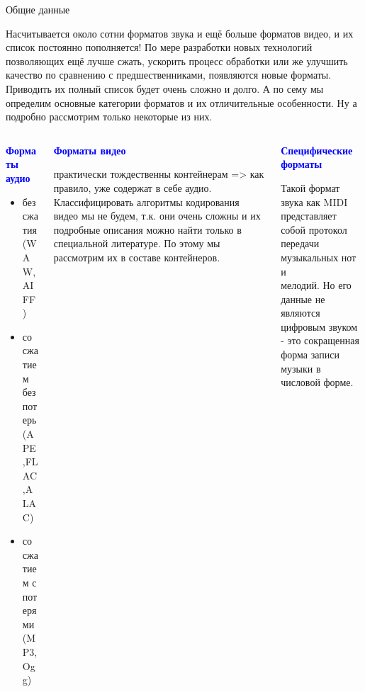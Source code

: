 \documentclass[aspectratio=169]{beamer}
\newcommand{\blu}{\textcolor{blue}}
\begin{document}
\begin{frame}[shrink=15]{Общие данные}

    Насчитывается около сотни форматов звука и ещё больше форматов видео, и их список постоянно пополняется! По мере разработки новых технологий позволяющих ещё лучше сжать, ускорить процесс обработки или же улучшить качество по сравнению с предшественниками, появляются новые форматы. Приводить их полный список будет очень сложно и долго. А по сему мы определим \alert{основные категории форматов и их отличительные особенности}. Ну а подробно рассмотрим только некоторые из них.
    \vspace{12pt}
    \begin{columns}[t]
    \begin{column}{5.55cm}
\blu{\textbf{Форматы аудио}}
\begin{itemize}
    \item без сжатия(\alert{WAW,AIFF})
    \item со сжатием без потерь(\alert{APE,FLAC,ALAC})
    \item со сжатием с потерями (\alert{MP3, Ogg})
\end{itemize}
    \end{column}
    
\vrule{}
    
    \begin{column}{6.55cm}
\blu{\textbf{Форматы видео}}

\alert{практически тождественны контейнерам} \small=> как правило, уже содержат в себе аудио. Классифицировать алгоритмы кодирования видео мы не будем, т.к. они очень сложны и их подробные описания можно найти только в специальной литературе. По этому мы рассмотрим их в составе \alert{контейнеров}.
    \end{column}
    
\vrule{}
    
    \begin{column}{6.6cm}
\blu{\textbf{Специфические форматы}}

Такой формат звука как \alert{MIDI} представляет собой протокол\\ передачи музыкальных нот и\\ мелодий. Но его данные не являются цифровым звуком - это сокращенная форма записи музыки в числовой форме.
    \end{column}
\end{columns}
\end{frame}
\end{document}

